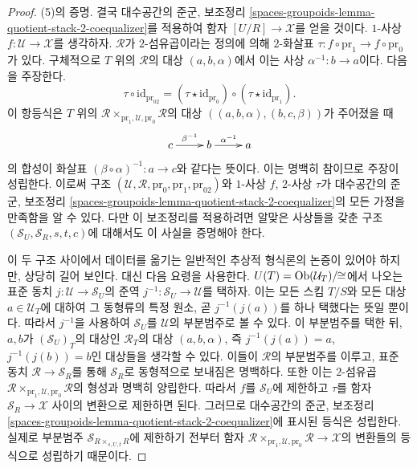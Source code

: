 \begin{proof}
\medskip\noindent
(5)의 증명. 결국 대수공간의 준군, 보조정리
\ref{spaces-groupoids-lemma-quotient-stack-2-coequalizer}를 적용하여 함자
$[U/R] \to \mathcal{X}$를 얻을 것이다. $1$-사상
$f : \mathcal{U} \to \mathcal{X}$를 생각하자. $\mathcal{R}$가
$2$-섬유곱이라는 정의에 의해 $2$-화살표
$\tau : f \circ \text{pr}_1 \to f \circ \text{pr}_0$가 있다. 구체적으로
$T$ 위의 $\mathcal{R}$의 대상 $(a, b, \alpha)$에서 이는 사상
$\alpha^{-1} : b \to a$이다. 다음을 주장한다.
$$
\tau \circ \text{id}_{\text{pr}_{02}} =
(\tau \star \text{id}_{\text{pr}_0})
\circ
(\tau \star \text{id}_{\text{pr}_1}).
$$
이 항등식은 $T$ 위의
$\mathcal{R} \times_{\text{pr}_1, \mathcal{U}, \text{pr}_0} \mathcal{R}$의
대상 $((a, b, \alpha), (b, c, \beta))$가 주어졌을 때
$$
\xymatrix{
c \ar[r]^{\beta^{-1}} & b \ar[r]^{\alpha^{-1}} & a
}
$$
의 합성이 화살표 $(\beta \circ \alpha)^{-1} : a \to c$와 같다는
뜻이다. 이는 명백히 참이므로 주장이 성립한다. 이로써 구조
$(\mathcal{U}, \mathcal{R}, \text{pr}_0, \text{pr}_1, \text{pr}_{02})$와
$1$-사상 $f$, $2$-사상 $\tau$가 대수공간의 준군, 보조정리
\ref{spaces-groupoids-lemma-quotient-stack-2-coequalizer}의 모든 가정을
만족함을 알 수 있다. 다만 이 보조정리를 적용하려면 알맞은 사상들을 갖춘
구조 $(\mathcal{S}_U, \mathcal{S}_R, s, t, c)$에 대해서도 이 사실을
증명해야 한다.

\medskip\noindent
이 두 구조 사이에서 데이터를 옮기는 일반적인 추상적 형식론의 논증이
있어야 하지만, 상당히 길어 보인다. 대신 다음 요령을 사용한다.
$U(T) = \mathop{\mathrm{Ob}}\nolimits(\mathcal{U}_T)/\!\!\cong$에서 나오는 표준 동치
$j : \mathcal{U} \to \mathcal{S}_U$의 준역
$j^{-1} : \mathcal{S}_U \to \mathcal{U}$를 택하자. 이는 모든 스킴
$T/S$와 모든 대상 $a \in \mathcal{U}_T$에 대하여 그 동형류의 특정 원소,
곧 $j^{-1}(j(a))$를 하나 택했다는 뜻일 뿐이다. 따라서 $j^{-1}$을
사용하여 $\mathcal{S}_U$를 $\mathcal{U}$의 부분범주로 볼 수 있다. 이
부분범주를 택한 뒤, $a, b$가 $(\mathcal{S}_U)_T$의 대상인
$\mathcal{R}_T$의 대상 $(a, b, \alpha)$, 즉
$j^{-1}(j(a)) = a$, $j^{-1}(j(b)) = b$인 대상들을 생각할 수 있다.
이들이 $\mathcal{R}$의 부분범주를 이루고, 표준 동치
$\mathcal{R} \to \mathcal{S}_R$를 통해 $\mathcal{S}_R$로 동형적으로
보내짐은 명백하다. 또한 이는 $2$-섬유곱
$\mathcal{R} \times_{\text{pr}_1, \mathcal{U}, \text{pr}_0} \mathcal{R}$의
형성과 명백히 양립한다. 따라서 $f$를 $\mathcal{S}_U$에 제한하고
$\tau$를 함자 $\mathcal{S}_R \to \mathcal{X}$ 사이의 변환으로 제한하면
된다. 그러므로 대수공간의 준군, 보조정리
\ref{spaces-groupoids-lemma-quotient-stack-2-coequalizer}에 표시된 등식은
성립한다. 실제로 부분범주
$\mathcal{S}_{R \times_{s, U, t} R}$에 제한하기 전부터 함자
$\mathcal{R} \times_{\text{pr}_1, \mathcal{U}, \text{pr}_0} \mathcal{R}
\to \mathcal{X}$의 변환들의 등식으로 성립하기 때문이다.


\end{proof}
